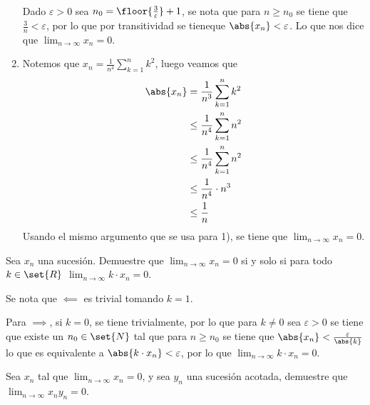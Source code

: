 \documentclass{ayudantia}
\begin{document}
\begin{ans}
\begin{sol}
\begin{enumerate}
\begin{align*}
            \end{align*}
            Dado \(\varepsilon>0\) sea \(n_0=\floor{\frac3\varepsilon}+1\), se nota que para \(n\geq n_0\) se tiene que \(\frac3n<\varepsilon\), por lo que por transitividad se tieneque \(\abs{x_n}<\varepsilon\). Lo que nos dice que \(\lim_{n\rightarrow\infty}x_n=0\).
            \item Notemos que \(x_n=\frac1{n^4}\sum_{k=1}^nk^2\), luego veamos que
            \begin{align*}
                \abs{x_n}&=\frac1{n^3}\sum_{k=1}^nk^2\\
                &\leq\frac1{n^4}\sum_{k=1}^nn^2\\
                &\leq\frac1{n^4}\sum_{k=1}^nn^2\\
                &\leq\frac1{n^4}\cdot n^3\\
                &\leq\frac1n\\
            \end{align*}
            Usando el mismo argumento que se usa para 1), se tiene que \(\lim_{n\rightarrow\infty}x_n=0\).
        \end{enumerate}
    \end{sol}
\end{ans}



\begin{prob}
    Sea \(x_n\) una sucesión. Demuestre que \(\lim_{n\rightarrow\infty}x_n=0\) si y solo si para todo \(k\in\set{R}\) \(\lim_{n\rightarrow\infty}k\cdot x_n=0\).
\end{prob}

\begin{ans}
    \begin{sol}
        Se nota que \(\impliedby\) es trivial tomando \(k=1\).

        Para \(\implies\), si \(k=0\), se tiene trivialmente, por lo que para \(k\neq0\) sea \(\varepsilon>0\) se tiene que existe un \(n_0\in\set{N}\) tal que para \(n\geq n_0\) se tiene que \(\abs{x_n}<\frac\varepsilon{\abs{k}}\) lo que es equivalente a \(\abs{k\cdot x_n}<\varepsilon\), por lo que \(\lim_{n\rightarrow\infty}k\cdot x_n=0\).
    \end{sol}
\end{ans}



\begin{prob}
    Sea \(x_n\) tal que \(\lim_{n\rightarrow\infty}x_n=0\), y sea \(y_n\) una sucesión acotada, demuestre que \(\lim_{n\rightarrow\infty}x_ny_n=0\).
\end{prob}
\end{document}
